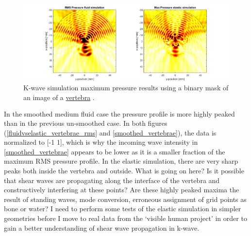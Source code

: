 \documentclass[10pt,a4paper]{article}
\begin{document}
\begin{figure}[H]
\hspace*{-4cm}
\includegraphics[scale=0.7]{max_p_smoothed_vert}
\caption{K-wave simulation maximum pressure results using a binary mask of an image of a \href{https://www.cedars-sinai.edu/Patients/Programs-and-Services/Spine-Center/The-Patient-Guide/Anatomy-of-the-Spine/Vertebrae-of-the-Spine.aspx}{vertebra} .}\label{max_p_smoothed_vert}
\end{figure} 


In the smoothed medium fluid case the pressure profile is more highly peaked than in the previous un-smoothed case. In both figures (\ref{fluidvselastic_vertebrae_rms} and \ref{smoothed_vertebrae}), the data is normalized to [-1 1], which is why the incoming wave intensity in \ref{smoothed_vertebrae} appears to be lower as it is a smaller fraction of the maximum RMS pressure profile. In the elastic simulation, there are very sharp peaks both inside the vertebra and outside. What is going on here? Is it possible that shear waves are propagating along the interface of the vertebra and constructively interfering at these points? Are these highly peaked maxima the result of standing waves, mode conversion, erroneous assignment of grid points as bone or water? I need to perform some tests of the elastic simulation in simpler geometries before I move to real data from the `visible human project' in order to gain a better understanding of shear wave propagation in k-wave. 



\newpage
{}

\end{document}

